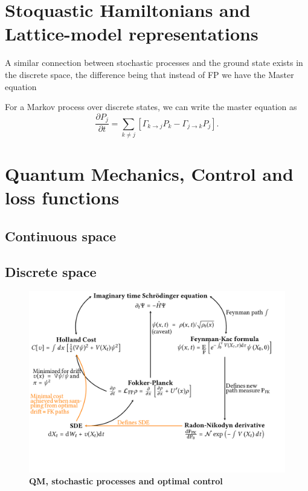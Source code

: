 \newpage
\section{Stoquastic Hamiltonians and Lattice-model representations}
\label{subsec:fk-latt}
A similar connection between stochastic processes and the ground state exists in the discrete space, the difference being that instead of FP we have the Master equation


For a Markov process over discrete states, we can write the master equation as 
\begin{equation}
	\frac{\partial P_{j}}{\partial t}=\sum_{k \neq j}\left[\Gamma_{k \rightarrow j} P_{k}-\Gamma_{j \rightarrow k} P_{j}\right].
\end{equation}


\newpage
\section{Quantum Mechanics, Control and loss functions}

\subsection{Continuous space}

\subsection{Discrete space}

\begin{figure}
	\centering
	\includegraphics[angle=90, width=\linewidth]{Diagrams/bp/bp-c5.pdf}
	\caption[QM, stochastic processes and optimal control]{\textbf{QM, stochastic processes and optimal control}}
	\label{fig:bp-c5}
\end{figure}



